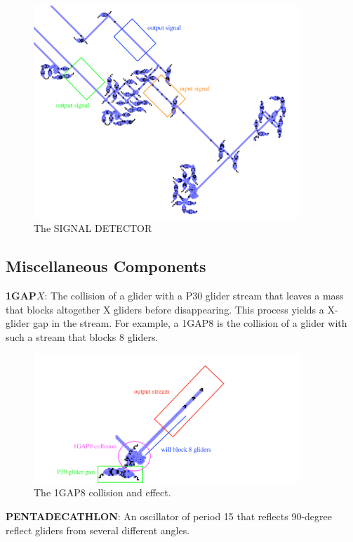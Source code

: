 \documentclass{article}
\begin{document}
\begin{figure}[h]
\centering
\includegraphics[width=10cm,keepaspectratio]{images/SIGNAL-DETECTOR.png}
\captionsetup{labelformat=empty} \caption{The SIGNAL DETECTOR}
\end{figure}
\subsection{Miscellaneous Components}
\noindent\textbf{1GAP$X$}: The collision of a glider with a P30 glider stream that leaves a mass that blocks altogether X gliders before disappearing. This process yields a X-glider gap in the stream. For example, a 1GAP8 is the collision of a glider with such a stream that blocks 8 gliders.

\vspace{1em}

\begin{figure}[h]
\centering
\includegraphics[width=10cm,keepaspectratio]{images/1GAP8.png}
\captionsetup{labelformat=empty} \caption{The 1GAP8 collision and effect.}
\end{figure}

\noindent\textbf{PENTADECATHLON}: An oscillator of period 15 that reflects 90-degree reflect gliders from several different angles.
\end{document}

